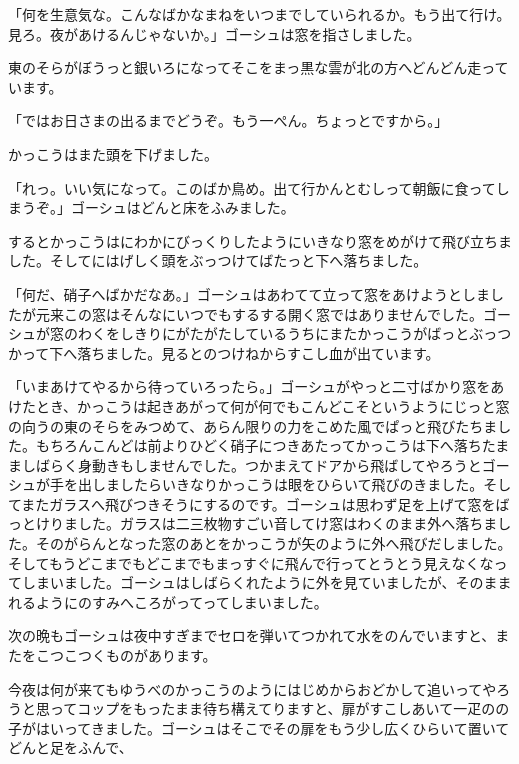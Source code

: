 \documentclass[uplatex,a5paper,twoside]{jsarticle}
\begin{document}
「何を生意気な。こんなばかなまねをいつまでしていられるか。もう出て行け。見ろ。夜があけるんじゃないか。」ゴーシュは窓を指さしました。

東のそらがぼうっと銀いろになってそこをまっ黒な雲が北の方へどんどん走っています。

「ではお日さまの出るまでどうぞ。もう一ぺん。ちょっとですから。」

かっこうはまた頭を下げました。

「れっ。いい気になって。このばか鳥め。出て行かんとむしって朝飯に食ってしまうぞ。」ゴーシュはどんと床をふみました。

するとかっこうはにわかにびっくりしたようにいきなり窓をめがけて飛び立ちました。そしてにはげしく頭をぶっつけてばたっと下へ落ちました。

「何だ、硝子へばかだなあ。」ゴーシュはあわてて立って窓をあけようとしましたが元来この窓はそんなにいつでもするする開く窓ではありませんでした。ゴーシュが窓のわくをしきりにがたがたしているうちにまたかっこうがばっとぶっつかって下へ落ちました。見るとのつけねからすこし血が出ています。

「いまあけてやるから待っていろったら。」ゴーシュがやっと二寸ばかり窓をあけたとき、かっこうは起きあがって何が何でもこんどこそというようにじっと窓の向うの東のそらをみつめて、あらん限りの力をこめた風でぱっと飛びたちました。もちろんこんどは前よりひどく硝子につきあたってかっこうは下へ落ちたまましばらく身動きもしませんでした。つかまえてドアから飛ばしてやろうとゴーシュが手を出しましたらいきなりかっこうは眼をひらいて飛びのきました。そしてまたガラスへ飛びつきそうにするのです。ゴーシュは思わず足を上げて窓をばっとけりました。ガラスは二三枚物すごい音してけ窓はわくのまま外へ落ちました。そのがらんとなった窓のあとをかっこうが矢のように外へ飛びだしました。そしてもうどこまでもどこまでもまっすぐに飛んで行ってとうとう見えなくなってしまいました。ゴーシュはしばらくれたように外を見ていましたが、そのままれるようにのすみへころがってってしまいました。

次の晩もゴーシュは夜中すぎまでセロを弾いてつかれて水をのんでいますと、またをこつこつくものがあります。

今夜は何が来てもゆうべのかっこうのようにはじめからおどかして追いってやろうと思ってコップをもったまま待ち構えてりますと、扉がすこしあいて一疋のの子がはいってきました。ゴーシュはそこでその扉をもう少し広くひらいて置いてどんと足をふんで、
\end{document}
